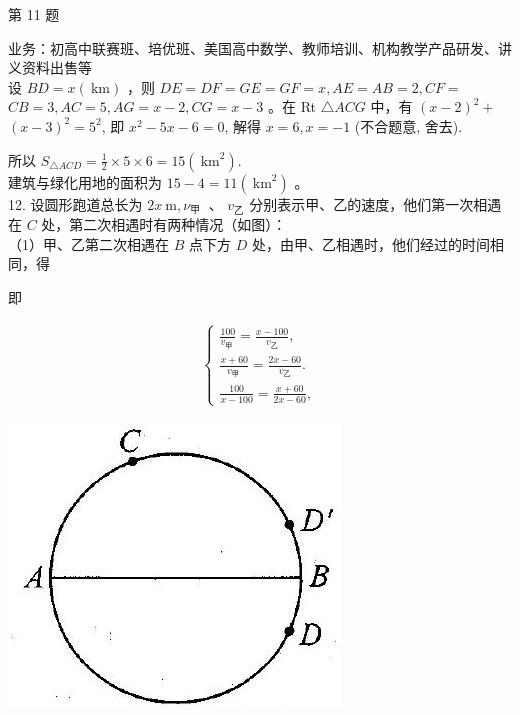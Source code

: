 \documentclass[10pt]{article}
\begin{document}
第 11 题

业务：初高中联赛班、培优班、美国高中数学、教师培训、机构教学产品研发、讲义资料出售等\\
设 $B D=x(\mathrm{~km})$ ，则 $D E=D F=G E=G F=x, A E=A B=2, C F=$ $C B=3, A C=5, A G=x-2, C G=x-3$ 。在 Rt $\triangle A C G$ 中，有 $(x-2)^{2}+$ $(x-3)^{2}=5^{2}$, 即 $x^{2}-5 x-6=0$, 解得 $x=6, x=-1$ (不合题意, 舍去).

所以 $S_{\triangle A C D}=\frac{1}{2} \times 5 \times 6=15\left(\mathrm{~km}^{2}\right)$.\\
建筑与绿化用地的面积为 $15-4=11\left(\mathrm{~km}^{2}\right)$ 。\\
12. 设圆形跑道总长为 $2 x \mathrm{~m}, \nu_{\text {甲 }}$ 、 $v_{乙}$ 分别表示甲、乙的速度，他们第一次相遇在 $C$ 处，第二次相遇时有两种情况（如图）：\\
（1）甲、乙第二次相遇在 $B$ 点下方 $D$ 处，由甲、乙相遇时，他们经过的时间相同，得

即

\begin{align*}
\left\{\begin{array}{l}
\frac{100}{v_{\text {甲 }}}=\frac{x-100}{v_{乙}}, \\
\frac{x+60}{v_{\text {甲 }}}=\frac{2 x-60}{v_{乙}} . \\
\frac{100}{x-100}=\frac{x+60}{2 x-60},
\end{array}\right.
\end{align*}

\begin{center}
\includegraphics[max width=\textwidth]{2024_10_30_26b590fd1106d28139f0g-152}
\end{center}
\end{document}
